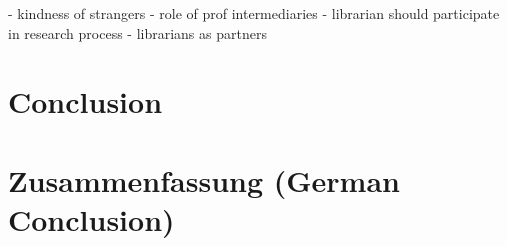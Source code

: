 \documentclass[12pt,a4paper,titlepage,oneside,abstract=true,toc=listof,toc=bibliography]{scrreprt}
\begin{document}
\cite{Constant1996} - kindness of strangers
\cite{Edmond2005} - role of prof intermediaries
\cite{Gunning1978} - librarian should participate in research process
\cite{MonroeGulick2013} - librarians as partners

\chapter{Conclusion}

\chapter{Zusammenfassung (German Conclusion)}

 
\cleardoublepage			

%
\end{document}
